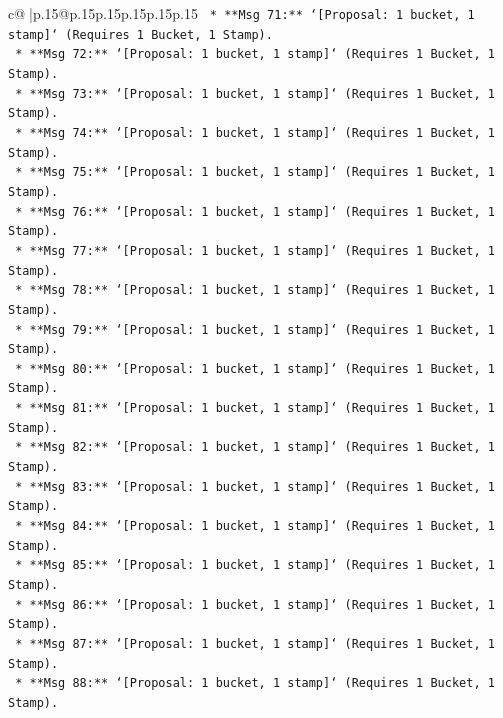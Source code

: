\documentclass{article}
\begin{document}
{\begin{supertabular}{c@{$\;$}|p{.15\linewidth}@{}p{.15\linewidth}p{.15\linewidth}p{.15\linewidth}p{.15\linewidth}p{.15\linewidth}}
{{{\texttt{                *   **Msg 71:** `{[}Proposal: 1 bucket, 1 stamp{]}` (Requires 1 Bucket, 1 Stamp).} \\
\texttt{                *   **Msg 72:** `{[}Proposal: 1 bucket, 1 stamp{]}` (Requires 1 Bucket, 1 Stamp).} \\
\texttt{                *   **Msg 73:** `{[}Proposal: 1 bucket, 1 stamp{]}` (Requires 1 Bucket, 1 Stamp).} \\
\texttt{                *   **Msg 74:** `{[}Proposal: 1 bucket, 1 stamp{]}` (Requires 1 Bucket, 1 Stamp).} \\
\texttt{                *   **Msg 75:** `{[}Proposal: 1 bucket, 1 stamp{]}` (Requires 1 Bucket, 1 Stamp).} \\
\texttt{                *   **Msg 76:** `{[}Proposal: 1 bucket, 1 stamp{]}` (Requires 1 Bucket, 1 Stamp).} \\
\texttt{                *   **Msg 77:** `{[}Proposal: 1 bucket, 1 stamp{]}` (Requires 1 Bucket, 1 Stamp).} \\
\texttt{                *   **Msg 78:** `{[}Proposal: 1 bucket, 1 stamp{]}` (Requires 1 Bucket, 1 Stamp).} \\
\texttt{                *   **Msg 79:** `{[}Proposal: 1 bucket, 1 stamp{]}` (Requires 1 Bucket, 1 Stamp).} \\
\texttt{                *   **Msg 80:** `{[}Proposal: 1 bucket, 1 stamp{]}` (Requires 1 Bucket, 1 Stamp).} \\
\texttt{                *   **Msg 81:** `{[}Proposal: 1 bucket, 1 stamp{]}` (Requires 1 Bucket, 1 Stamp).} \\
\texttt{                *   **Msg 82:** `{[}Proposal: 1 bucket, 1 stamp{]}` (Requires 1 Bucket, 1 Stamp).} \\
\texttt{                *   **Msg 83:** `{[}Proposal: 1 bucket, 1 stamp{]}` (Requires 1 Bucket, 1 Stamp).} \\
\texttt{                *   **Msg 84:** `{[}Proposal: 1 bucket, 1 stamp{]}` (Requires 1 Bucket, 1 Stamp).} \\
\texttt{                *   **Msg 85:** `{[}Proposal: 1 bucket, 1 stamp{]}` (Requires 1 Bucket, 1 Stamp).} \\
\texttt{                *   **Msg 86:** `{[}Proposal: 1 bucket, 1 stamp{]}` (Requires 1 Bucket, 1 Stamp).} \\
\texttt{                *   **Msg 87:** `{[}Proposal: 1 bucket, 1 stamp{]}` (Requires 1 Bucket, 1 Stamp).} \\
\texttt{                *   **Msg 88:** `{[}Proposal: 1 bucket, 1 stamp{]}` (Requires 1 Bucket, 1 Stamp).} \\
}}}
\end{supertabular}}
\end{document}
